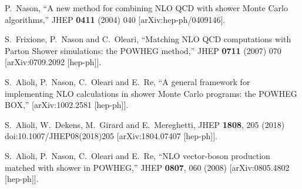 \documentclass[paper]{JHEP3}
\begin{document}
\begin{thebibliography}{10}

  P.~Nason,
  ``A new method for combining NLO QCD with shower Monte Carlo algorithms,''
  JHEP {\bf 0411} (2004) 040
  [arXiv:hep-ph/0409146].

  S.~Frixione, P.~Nason and C.~Oleari,
``Matching NLO QCD computations with Parton Shower simulations: the POWHEG
method,''
  JHEP {\bf 0711} (2007) 070
  [arXiv:0709.2092 [hep-ph]].

  S.~Alioli, P.~Nason, C.~Oleari and E.~Re,
``A general framework for implementing NLO calculations in shower Monte Carlo
  programs: the POWHEG BOX,''
  [arXiv:1002.2581 [hep-ph]].


  
  S.~Alioli, W.~Dekens, M.~Girard and E.~Mereghetti,
  JHEP {\bf 1808}, 205 (2018)
  doi:10.1007/JHEP08(2018)205
  [arXiv:1804.07407 [hep-ph]].

 S.~Alioli, P.~Nason, C.~Oleari and E.~Re,
  ``NLO vector-boson production matched with shower in POWHEG,''
  JHEP {\bf 0807}, 060 (2008)
  [arXiv:0805.4802 [hep-ph]].


\end{thebibliography}
\end{document}
